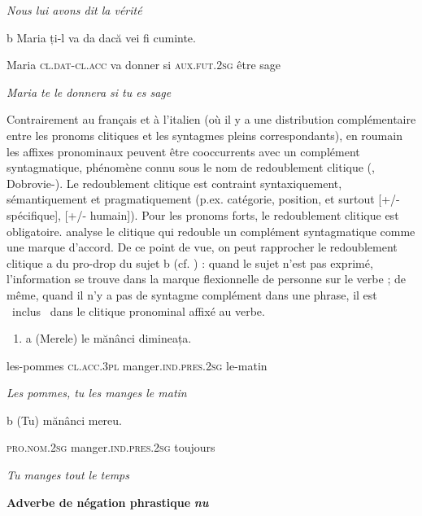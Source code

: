 \textit{Nous lui avons dit la vérité}  

  b  Maria  ți-l  va  da  dacă  vei  fi  cuminte.

Maria\textsc{  cl.dat-cl.acc}  va  donner si  \textsc{aux.fut.2sg}  être  sage

{\itshape
    Maria te le donnera si tu es sage}

Contrairement au français et à l'italien (où il y a une distribution complémentaire entre les pronoms clitiques et les syntagmes pleins correspondants), en roumain les affixes pronominaux peuvent être cooccurrents avec un complément syntagmatique, phénomène connu sous le nom de redoublement clitique (\citet{Farkas1978}, Dobrovie-\citet{Sorin1994}). Le redoublement clitique est contraint syntaxiquement, sémantiquement et pragmatiquement (p.ex. catégorie, position, et surtout [+/- spécifique], [+/- humain]). Pour les pronoms forts, le redoublement clitique est obligatoire. \citet{Monachesi2005} analyse le clitique qui redouble un complément syntagmatique comme une marque d'accord. De ce point de vue, on peut rapprocher le redoublement clitique a du pro-drop du sujet b (cf. \citet{Barbu1999}) : quand le sujet n'est pas exprimé, l'information se trouve dans la marque flexionnelle de personne sur le verbe ; de même, quand il n'y a pas de syntagme complément dans une phrase, il est {\guillemotleft}~inclus~{\guillemotright} dans le clitique pronominal affixé au verbe. 


\begin{enumerate}
\item \label{bkm:Ref299294746}a  (Merele)  le  mănânci  dimineața.


\end{enumerate}
les-pommes  \textsc{cl.acc.3pl}  manger.\textsc{ind.pres.2sg}  le-matin

\textit{Les pommes, tu les manges le matin}  

  b  (Tu)  mănânci  mereu.

\textsc{pro.nom.2sg}  manger.\textsc{ind.pres.2sg}  toujours

{\itshape
    Tu manges tout le temps}

\textbf{Adverbe de négation phrastique} \textbf{\textit{nu} }

